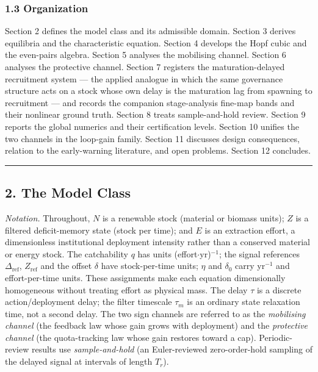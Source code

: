 \documentclass[11pt]{article}
\begin{document}
\subsubsection{1.3 Organization}\label{organization}

Section 2 defines the model class and its admissible domain. Section 3
derives equilibria and the characteristic equation. Section 4 develops
the Hopf cubic and the even-pairs algebra. Section 5 analyses the
mobilising channel. Section 6 analyses the protective channel. Section 7
registers the maturation-delayed recruitment system --- the applied
analogue in which the same governance structure acts on a stock whose
own delay is the maturation lag from spawning to recruitment --- and
records the companion stage-analysis fine-map bands and their nonlinear
ground truth. Section 8 treats sample-and-hold review. Section 9 reports
the global numerics and their certification levels. Section 10 unifies
the two channels in the loop-gain family. Section 11 discusses design
consequences, relation to the early-warning literature, and open
problems. Section 12 concludes.

\begin{center}\rule{0.5\linewidth}{0.5pt}\end{center}

\subsection{2. The Model Class}\label{the-model-class}

\emph{Notation.} Throughout, \(N\) is a renewable stock (material or
biomass units); \(Z\) is a filtered deficit-memory state (stock per
time); and \(E\) is an extraction effort, a dimensionless institutional
deployment intensity rather than a conserved material or energy stock.
The catchability \(q\) has units (effort\ensuremath{\cdot}yr)\(^{-1}\); the signal
references \(\Delta_{\mathrm{ref}}\), \(Z_{\mathrm{ref}}\) and the
offset \(\delta\) have stock-per-time units; \(\eta\) and \(\delta_0\)
carry yr\(^{-1}\) and effort-per-time units. These assignments make each
equation dimensionally homogeneous without treating effort as physical
mass. The delay \(\tau\) is a discrete action/deployment delay; the
filter timescale \(\tau_m\) is an ordinary state relaxation time, not a
second delay. The two sign channels are referred to as the
\emph{mobilising channel} (the feedback law whose gain grows with
deployment) and the \emph{protective channel} (the quota-tracking law
whose gain restores toward a cap). Periodic-review results use
\emph{sample-and-hold} (an Euler-reviewed zero-order-hold sampling of
the delayed signal at intervals of length \(T_r\)).
\end{document}
